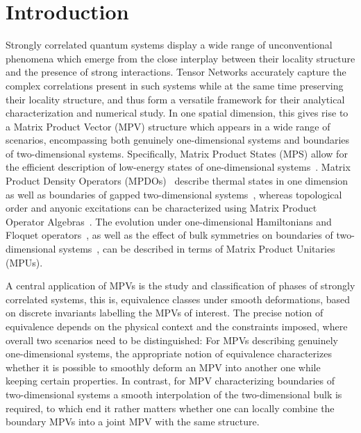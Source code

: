 \documentclass[pra,twocolumn,nofootinbib,superscriptaddress]{revtex4-1}
\begin{document}
\section{Introduction}


Strongly correlated quantum systems display a wide range of unconventional
phenomena which emerge from the close interplay between their locality
structure and the presence of strong interactions.  Tensor Networks
accurately capture the complex correlations present in such systems while
at the same time preserving their locality structure, and thus form a
versatile framework for their analytical characterization and numerical
study. In one spatial dimension, this gives rise to a Matrix Product
Vector (MPV) structure which appears in a wide range of scenarios,
encompassing both genuinely one-dimensional systems and boundaries of
two-dimensional systems.  Specifically, Matrix Product States (MPS) allow
for the efficient description of low-energy states of one-dimensional
systems~\cite{hastings:arealaw,verstraete:faithfully}. Matrix Product
Density Operators
(MPDOs)~\cite{verstraete:finite-t-mps,zwolak:mixedstate-timeevol-mpdo}
describe thermal states in one dimension as well as boundaries of gapped
two-dimensional systems~\cite{cirac:peps-boundaries}, whereas topological
order and anyonic excitations can be characterized using Matrix Product
Operator Algebras~\cite{sahinoglu:mpo-injectivity,bultinck:mpo-anyons}.
The evolution under one-dimensional Hamiltonians and Floquet
operators~\cite{po:chiral-floquet-mbl-etal}, as well as the effect of bulk
symmetries on boundaries of two-dimensional
systems~\cite{chen:2d-spt-phases-peps-ghz}, can be described in terms of
Matrix Product Unitaries (MPUs).

A central application of MPVs is the study and classification of phases of
strongly correlated systems, this is, equivalence classes under
smooth deformations, based on discrete invariants labelling the MPVs of
interest.  The precise notion of equivalence depends on the
physical context and the constraints imposed, where overall
two scenarios need to be distinguished: For MPVs describing
genuinely one-dimensional systems, the appropriate notion of equivalence
characterizes whether it is possible to smoothly deform an MPV into
another one while keeping certain properties.  In contrast, for MPV
characterizing boundaries of two-dimensional systems a smooth
interpolation of the two-dimensional bulk is required, to which end it
rather matters whether one can locally combine the boundary MPVs into a
joint MPV with the same structure.
\end{document}
